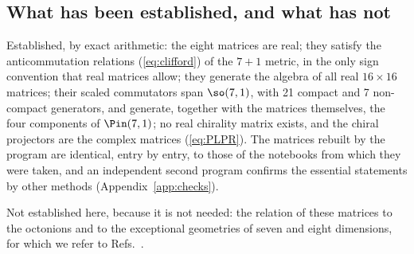 \subsection{What has been established, and what has not}

Established, by exact arithmetic: the eight matrices are real; they satisfy the anticommutation
relations (\ref{eq:clifford}) of the $7+1$ metric, in the only sign convention that real matrices
allow; they generate the algebra of all real $16\times16$ matrices; their scaled commutators span
$\so(7,1)$, with 21 compact and 7 non-compact generators, and generate, together with the matrices
themselves, the four components of $\Pin(7,1)$; no real chirality matrix exists, and the chiral
projectors are the complex matrices (\ref{eq:PLPR}). The matrices rebuilt by the program are
identical, entry by entry, to those of the notebooks from which they were taken, and an independent
second program confirms the essential statements by other methods (Appendix~\ref{app:checks}).

Not established here, because it is not needed: the relation of these matrices to the octonions and
to the exceptional geometries of seven and eight dimensions, for which we refer to
Refs.~\cite{Bryant1982,HarveyLawson1982,BrownGray1967}.
